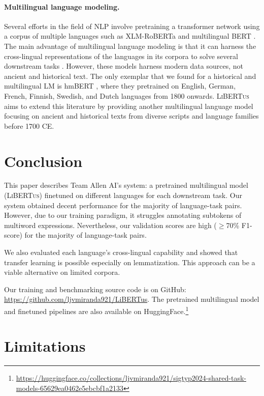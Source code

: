 \documentclass[11pt]{article}
\newcommand{\libertus}{\textsc{LiBERTus}}
\newcommand{\teamname}{Allen AI}
\newcommand{\githuburl}{\url{https://github.com/ljvmiranda921/LiBERTus}}
\begin{document}
\paragraph{Multilingual language modeling.}
Several efforts in the field of NLP involve pretraining a transformer network \cite{vaswani-etal-2017-attention} using a corpus of multiple languages such as XLM-RoBERTa \cite{liu-etal-2019-roberta} and multilingual BERT \cite{conneau-etal-2020-unsupervised}.
The main advantage of multilingual language modeling is that it can harness the cross-lingual representations of the languages in its corpora to solve several downstream tasks \cite{chang-etal-2022-geometry}.
However, these models harness modern data sources, not ancient and historical text.
The only exemplar that we found for a historical and multilingual LM is hmBERT \cite{schweter-etal-2022-hmbert}, where they pretrained on English, German, French, Finnish, Swedish, and Dutch languages from 1800 onwards.
\libertus{} aims to extend this literature by providing another multilingual language model focusing on ancient and historical texts from diverse scripts and language families before 1700 CE.

\section{Conclusion}

This paper describes Team \teamname{}'s system: a pretrained multilingual model (\libertus{}) finetuned on different languages for each downstream task.
Our system obtained decent performance for the majority of language-task pairs.
However, due to our training paradigm, it struggles annotating subtokens of multiword expressions.
Nevertheless, our validation scores are high ($\geq$70\% F1-score) for the majority of language-task pairs.

We also evaluated each language's cross-lingual capability and showed that transfer learning is possible especially on lemmatization.
This approach can be a viable alternative on limited corpora.

Our training and benchmarking source code is on GitHub: \githuburl{}.
The pretrained multilingual model and finetuned pipelines are also available on HuggingFace.\footnote[2]{\url{https://huggingface.co/collections/ljvmiranda921/sigtyp2024-shared-task-models-65629ea0462e5ebcbf1a2133}}

\section*{Limitations}
\end{document}

